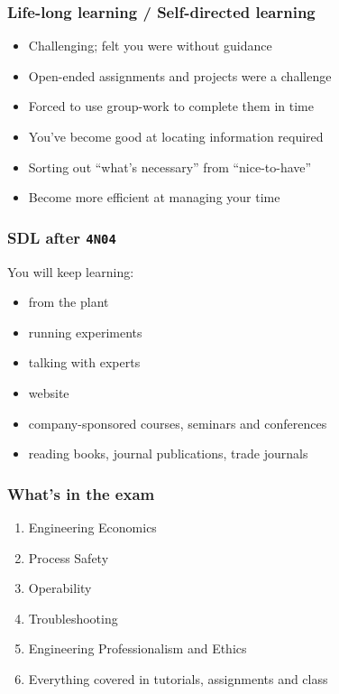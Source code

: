 \begin{frame}\frametitle{Life-long learning / Self-directed learning}
	\begin{itemize}
		\item	Challenging; felt you were without guidance
		\item	Open-ended assignments and projects were a challenge
		\item	Forced to use group-work to complete them in time
		\item	You've become good at locating information required
		\item	Sorting out ``what's necessary'' from ``nice-to-have''
		\item	Become more efficient at managing your time
	\end{itemize}
\end{frame}

\begin{frame}\frametitle{SDL after \texttt{4N04}}
	You will keep learning:
	\begin{itemize}
		\item	from the plant
		\item	running experiments
		\item	talking with experts
		\item	website
		\item	company-sponsored courses, seminars and conferences
		\item	reading books, journal publications, trade journals
	\end{itemize}
\end{frame}

\begin{frame}\frametitle{What's in the exam}
	\begin{enumerate}
		\item	Engineering Economics
		\item	Process Safety
		\item	Operability
		\item	Troubleshooting
		\item	Engineering Professionalism and Ethics
		\item	Everything covered in tutorials, assignments and class
	\end{enumerate}
\end{frame}

